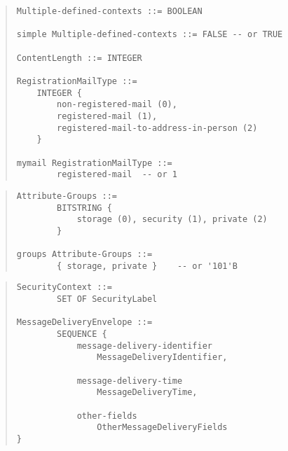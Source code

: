 \begin{bwslide}

\begin{quote}\small\begin{verbatim}
Multiple-defined-contexts ::= BOOLEAN

simple Multiple-defined-contexts ::= FALSE -- or TRUE

ContentLength ::= INTEGER

RegistrationMailType ::= 
    INTEGER {
        non-registered-mail (0),
        registered-mail (1),
        registered-mail-to-address-in-person (2)
    }

mymail RegistrationMailType ::=
        registered-mail  -- or 1
\end{verbatim}\end{quote}
\end{bwslide}


\begin{bwslide}
\begin{quote}\small\begin{verbatim}
Attribute-Groups ::=
        BITSTRING {
            storage (0), security (1), private (2)
        }

groups Attribute-Groups ::=
        { storage, private }	-- or '101'B
\end{verbatim}\end{quote}
\end{bwslide}


%


\begin{bwslide}
\begin{quote}\small\begin{verbatim}
SecurityContext ::=
        SET OF SecurityLabel

MessageDeliveryEnvelope ::=
        SEQUENCE {
            message-delivery-identifier
                MessageDeliveryIdentifier,

            message-delivery-time
                MessageDeliveryTime,

            other-fields
                OtherMessageDeliveryFields
}
\end{verbatim}\end{quote}
\end{bwslide}


